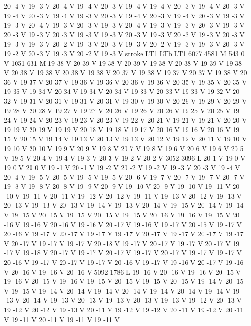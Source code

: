 {{{{{20 -4 V
19 -3 V
20 -4 V
19 -4 V
20 -3 V
19 -4 V
19 -4 V
20 -3 V
19 -4 V
20 -3 V
19 -4 V
20 -3 V
19 -4 V
19 -3 V
20 -3 V
19 -4 V
20 -3 V
19 -4 V
20 -3 V
19 -3 V
19 -3 V
20 -4 V
19 -3 V
20 -3 V
19 -3 V
20 -4 V
19 -3 V
19 -3 V
20 -3 V
19 -3 V
20 -3 V
19 -3 V
20 -3 V
19 -3 V
19 -3 V
20 -3 V
19 -3 V
20 -3 V
19 -3 V
20 -3 V
19 -3 V
19 -3 V
20 -2 V
19 -3 V
20 -3 V
19 -3 V
20 -2 V
19 -3 V
19 -3 V
20 -3 V
19 -2 V
20 -3 V
19 -3 V
20 -2 V
19 -3 V
stroke
LT1
LTb
LT1
6077 4581 M
543 0 V
1051 631 M
19 38 V
20 39 V
19 38 V
20 39 V
19 38 V
20 38 V
19 39 V
19 38 V
20 38 V
19 38 V
20 38 V
19 38 V
20 37 V
19 38 V
19 37 V
20 37 V
19 38 V
20 36 V
19 37 V
20 37 V
19 36 V
19 36 V
20 36 V
19 36 V
20 35 V
19 35 V
20 35 V
19 35 V
19 34 V
20 34 V
19 34 V
20 34 V
19 33 V
20 33 V
19 33 V
19 32 V
20 32 V
19 31 V
20 31 V
19 31 V
20 31 V
19 30 V
19 30 V
20 29 V
19 29 V
20 29 V
19 28 V
20 28 V
19 27 V
19 27 V
20 26 V
19 26 V
20 26 V
19 25 V
20 25 V
19 24 V
19 24 V
20 23 V
19 23 V
20 23 V
19 22 V
20 21 V
19 21 V
19 21 V
20 20 V
19 19 V
20 19 V
19 19 V
20 18 V
19 18 V
19 17 V
20 16 V
19 16 V
20 16 V
19 15 V
20 15 V
19 14 V
19 13 V
20 13 V
19 13 V
20 12 V
19 12 V
20 11 V
19 10 V
19 10 V
20 10 V
19 9 V
20 9 V
19 8 V
20 7 V
19 8 V
19 6 V
20 6 V
19 6 V
20 5 V
19 5 V
20 4 V
19 4 V
19 3 V
20 3 V
19 2 V
20 2 V
3052 3096 L
20 1 V
19 0 V
19 0 V
20 0 V
19 -1 V
20 -1 V
19 -2 V
20 -2 V
19 -2 V
19 -3 V
20 -3 V
19 -4 V
20 -4 V
19 -5 V
20 -5 V
19 -5 V
19 -5 V
20 -6 V
19 -7 V
20 -7 V
19 -7 V
20 -7 V
19 -8 V
19 -8 V
20 -8 V
19 -9 V
20 -9 V
19 -10 V
20 -9 V
19 -10 V
19 -11 V
20 -10 V
19 -11 V
20 -11 V
19 -12 V
20 -12 V
19 -11 V
19 -13 V
20 -12 V
19 -13 V
20 -13 V
19 -13 V
20 -13 V
19 -14 V
19 -13 V
20 -14 V
19 -15 V
20 -14 V
19 -14 V
19 -15 V
20 -15 V
19 -15 V
20 -15 V
19 -15 V
20 -16 V
19 -16 V
19 -15 V
20 -16 V
19 -16 V
20 -16 V
19 -16 V
20 -17 V
19 -16 V
19 -17 V
20 -16 V
19 -17 V
20 -16 V
19 -17 V
20 -17 V
19 -17 V
19 -17 V
20 -17 V
19 -17 V
20 -17 V
19 -17 V
20 -17 V
19 -17 V
19 -17 V
20 -18 V
19 -17 V
20 -17 V
19 -17 V
20 -17 V
19 -17 V
19 -18 V
20 -17 V
19 -17 V
20 -17 V
19 -17 V
20 -17 V
19 -17 V
19 -17 V
20 -16 V
19 -17 V
20 -17 V
19 -17 V
20 -16 V
19 -17 V
19 -16 V
20 -17 V
19 -16 V
20 -16 V
19 -16 V
20 -16 V
5092 1786 L
19 -16 V
20 -16 V
19 -16 V
20 -15 V
19 -16 V
20 -15 V
19 -16 V
19 -15 V
20 -15 V
19 -15 V
20 -15 V
19 -14 V
20 -15 V
19 -15 V
19 -14 V
20 -14 V
19 -14 V
20 -14 V
19 -14 V
20 -14 V
19 -14 V
19 -13 V
20 -14 V
19 -13 V
20 -13 V
19 -13 V
20 -13 V
19 -13 V
19 -12 V
20 -13 V
19 -12 V
20 -12 V
19 -13 V
20 -11 V
19 -12 V
19 -12 V
20 -11 V
19 -12 V
20 -11 V
19 -11 V
20 -11 V
19 -11 V
19 -11 V
}}}}}
